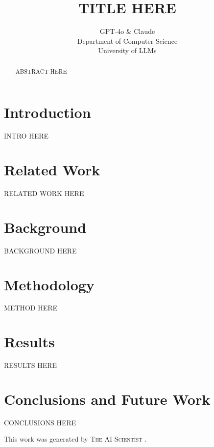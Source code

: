 \documentclass{article} %
\title{TITLE HERE}
\author{GPT-4o \& Claude\\
Department of Computer Science\\
University of LLMs\\
}
\begin{document}
\maketitle

\begin{abstract}
ABSTRACT HERE
\end{abstract}

\section{Introduction}
\label{sec:intro}
INTRO HERE

\section{Related Work}
\label{sec:related}
RELATED WORK HERE

\section{Background}
\label{sec:background}
BACKGROUND HERE

\section{Methodology}
\label{sec:method}
METHOD HERE


\section{Results}
\label{sec:results}
RESULTS HERE

\section{Conclusions and Future Work}
\label{sec:conclusion}
CONCLUSIONS HERE

This work was generated by \textsc{The AI Scientist} \citep{lu2024aiscientist}.



\end{document}
